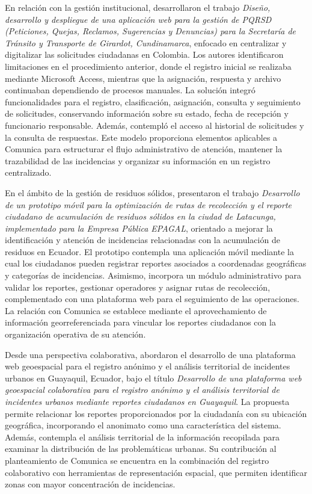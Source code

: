 En relación con la gestión institucional, \textcite{moreno2026diseno} desarrollaron el trabajo \textit{Diseño, desarrollo y despliegue de una aplicación web para la gestión de PQRSD (Peticiones, Quejas, Reclamos, Sugerencias y Denuncias) para la Secretaría de Tránsito y Transporte de Girardot, Cundinamarca}, enfocado en centralizar y digitalizar las solicitudes ciudadanas en Colombia. Los autores identificaron limitaciones en el procedimiento anterior, donde el registro inicial se realizaba mediante Microsoft Access, mientras que la asignación, respuesta y archivo continuaban dependiendo de procesos manuales. La solución integró funcionalidades para el registro, clasificación, asignación, consulta y seguimiento de solicitudes, conservando información sobre su estado, fecha de recepción y funcionario responsable. Además, contempló el acceso al historial de solicitudes y la consulta de respuestas. Este modelo proporciona elementos aplicables a Comunica para estructurar el flujo administrativo de atención, mantener la trazabilidad de las incidencias y organizar su información en un registro centralizado.

En el ámbito de la gestión de residuos sólidos, \textcite{rodriguezdesarrollo} presentaron el trabajo \textit{Desarrollo de un prototipo móvil para la optimización de rutas de recolección y el reporte ciudadano de acumulación de residuos sólidos en la ciudad de Latacunga, implementado para la Empresa Pública EPAGAL}, orientado a mejorar la identificación y atención de incidencias relacionadas con la acumulación de residuos en Ecuador. El prototipo contempla una aplicación móvil mediante la cual los ciudadanos pueden registrar reportes asociados a coordenadas geográficas y categorías de incidencias. Asimismo, incorpora un módulo administrativo para validar los reportes, gestionar operadores y asignar rutas de recolección, complementado con una plataforma web para el seguimiento de las operaciones. La relación con Comunica se establece mediante el aprovechamiento de información georreferenciada para vincular los reportes ciudadanos con la organización operativa de su atención.

Desde una perspectiva colaborativa, \textcite{izurieta2026desarrollo} abordaron el desarrollo de una plataforma web geoespacial para el registro anónimo y el análisis territorial de incidentes urbanos en Guayaquil, Ecuador, bajo el título \textit{Desarrollo de una plataforma web geoespacial colaborativa para el registro anónimo y el análisis territorial de incidentes urbanos mediante reportes ciudadanos en Guayaquil}. La propuesta permite relacionar los reportes proporcionados por la ciudadanía con su ubicación geográfica, incorporando el anonimato como una característica del sistema. Además, contempla el análisis territorial de la información recopilada para examinar la distribución de las problemáticas urbanas. Su contribución al planteamiento de Comunica se encuentra en la combinación del registro colaborativo con herramientas de representación espacial, que permiten identificar zonas con mayor concentración de incidencias.

